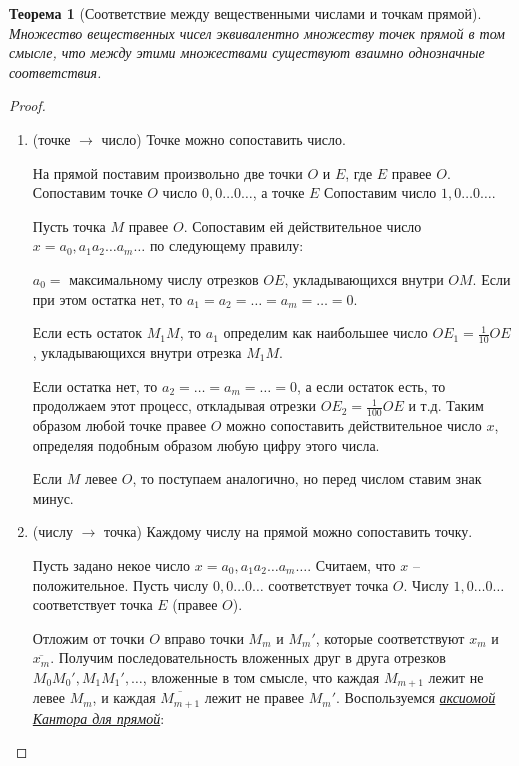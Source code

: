 \documentclass{article}
\theoremstyle{break}
\newtheorem{theorem}{Теорема}[subsection]
\begin{document}
\begin{theorem}[Соответствие между вещественными числами и точкам прямой]
    Множество вещественных чисел эквивалентно множеству точек прямой в том смысле, что
    между этими множествами существуют взаимно однозначные соответствия.
\end{theorem}
\begin{proof}
    \begin{enumerate}
        \item 
            (точке $\rightarrow$ число) Точке можно сопоставить число.
        
            На прямой поставим произвольно две точки $O$ и $E$, где $E$ правее $O$.
            Сопоставим точке $O$ число $0,0 \dots 0 \dots$, а точке $E$
            Сопоставим число $1,0 \dots 0 \dots$.
            
            Пусть точка $M$ правее $O$. Сопоставим ей действительное число
            $x = a_0,a_1 a_2 \dots a_m \dots$ по следующему правилу:
            
            $a_0 = $ максимальному числу отрезков $OE$, укладывающихся внутри $OM$.
            Если при этом остатка нет, то $a_1 = a_2 = \dots = a_m = \dots = 0$.
            
            Если есть остаток $M_1M$, то $a_1$ определим как наибольшее число
            $OE_1 = \frac{1}{10}OE$, укладывающихся внутри отрезка $M_1M$.
            
            Если остатка нет, то $a_2 = \dots = a_m = \dots = 0$, а если остаток есть,
            то продолжаем этот процесс, откладывая отрезки $OE_2 = \frac{1}{100}OE$ 
            и т.д. Таким образом любой точке правее $O$ можно сопоставить действительное
            число $x$, определяя подобным образом любую цифру этого числа.
            
            Если $M$ левее $O$, то поступаем аналогично, но перед числом ставим знак минус.
    
        \item 
            (числу $\rightarrow$ точка) Каждому числу на прямой можно сопоставить точку.
        
            Пусть задано некое число $x = a_0,a_1 a_2 \dots a_m \dots$. Считаем, что
            $x$ -- положительное. Пусть числу $0,0 \dots 0 \dots$ соответствует точка $O$.
            Числу $1,0 \dots 0 \dots$ соответствует точка $E$ (правее $O$).
            
            Отложим от точки $O$ вправо точки $M_m$ и $M_m'$, которые соответствуют
            $x_m$ и $\overline{x_m}$. Получим последовательность вложенных друг в друга
            отрезков $M_0M_0', M_1M_1', \dots$, вложенные в том смысле, что каждая
            $M_{m+1}$ лежит не левее $M_m$, и каждая $\overline{M_{m+1}}$ лежит
            не правее $M_m'$. Воспользуемся \underline{\textit{аксиомой Кантора для прямой}}:
            

\end{enumerate}
\end{proof}
\end{document}
